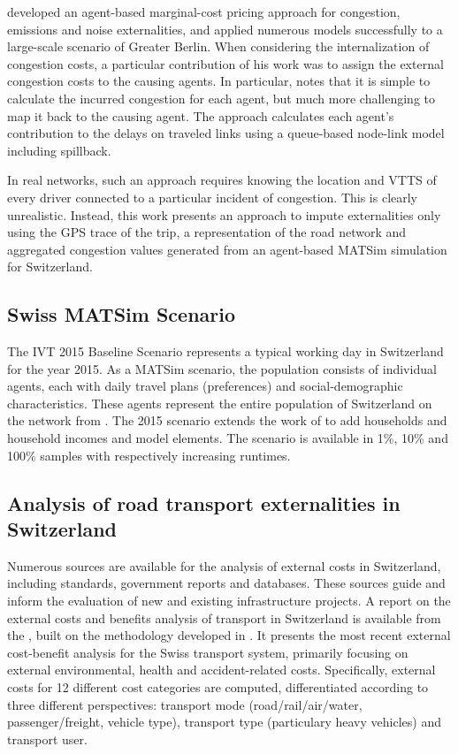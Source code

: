 \label{section:kaddoura_congestion_approach}
\citet{kaddoura2015marginal} developed an agent-based marginal-cost pricing approach for congestion, emissions and noise externalities, and applied numerous models successfully to a large-scale scenario of Greater Berlin.
When considering the internalization of congestion costs, a particular contribution of his work was to assign the external congestion costs to the causing agents.
In particular, \citet{kaddoura2015marginal} notes that it is simple to calculate the incurred congestion for each agent, but much more challenging to map it back to the causing agent.
The approach calculates each agent's contribution to the delays on traveled links using a queue-based node-link model including spillback.

In real networks, such an approach requires knowing the location and VTTS of every driver connected to a particular incident of congestion.
This is clearly unrealistic. 
Instead, this work presents an approach to impute externalities only using the GPS trace of the trip, a representation of the road network and aggregated congestion values generated from an agent-based MATSim simulation for Switzerland.

\subsection{Swiss MATSim Scenario}
\label{section:matsim-scenario}
The IVT 2015 Baseline Scenario \citep{bosch2016ivt} represents a typical working day in Switzerland for the year 2015.
As a MATSim scenario, the population consists of individual agents, each with daily travel plans (preferences) and social-demographic characteristics.
These agents represent the entire population of Switzerland on the network from \citet{bosch2015multi}.
The 2015 scenario extends the work of \citet{balmer2006agent} to add households and household incomes and model elements. 
The scenario is available in 1\%, 10\% and 100\% samples with respectively increasing runtimes. 

\subsection{Analysis of road transport externalities in Switzerland}  %

Numerous sources are available for the analysis of external costs in Switzerland, including standards, government reports and databases. 
These sources guide and inform the evaluation of new and existing infrastructure projects. 
A report on the external costs and benefits analysis of transport in Switzerland is available from the \citet{are2016externalcosts}, built on the methodology developed in \citet{ecoplaninfras2014externeeffekte}.
It presents the most recent external cost-benefit analysis for the Swiss transport system, primarily focusing on external environmental, health and accident-related costs.
Specifically, external costs for 12 different cost categories are computed, differentiated according to three different perspectives: transport mode (road/rail/air/water, passenger/freight, vehicle type), transport type (particulary heavy vehicles) and transport user. 


